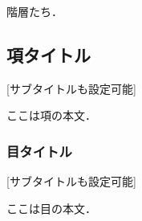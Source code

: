 
階層たち．

\subsection{項タイトル}[サブタイトルも設定可能]

ここは項の本文．\\

\subsubsection{目タイトル}[サブタイトルも設定可能]

ここは目の本文．\\
